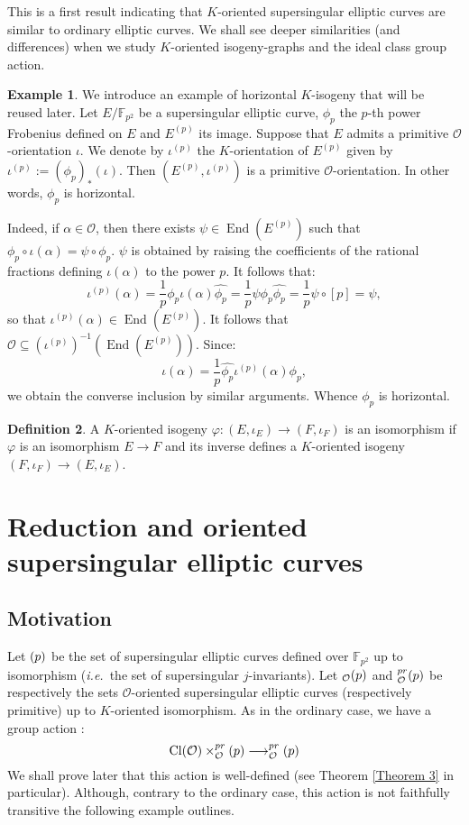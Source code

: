 \documentclass[a4paper,10pt]{report}
\theoremstyle{definition}
\newtheorem{Definition}{Definition}[chapter]
\theoremstyle{plain}
\theoremstyle{definition}
\newtheorem{Example}[Definition]{Example}
\newcommand{\ie}{\emph{i.e.}\ }
\newcommand{\F}{\mathbb{F}}
\newcommand{\mO}{\mathcal{O}}
\renewcommand{\(}{\left(}
\renewcommand{\)}{\right)}
\DeclareMathOperator{\End}{End}
\DeclareMathOperator{\Cl}{Cl}
\let\SS\relax
\DeclareMathOperator{\SS}{SS}
\begin{document}
This is a first result indicating that $K$-oriented supersingular elliptic curves are similar to ordinary elliptic curves. We shall see deeper similarities (and differences) when we study $K$-oriented isogeny-graphs and the ideal class group action.

\begin{Example}
We introduce an example of horizontal $K$-isogeny that will be reused later.  Let $E/\F_{p^2}$ be a supersingular elliptic curve, $\phi_p$ the $p$-th power Frobenius defined on $E$ and $E^{(p)}$ its image. Suppose that $E$ admits a primitive $\mO$-orientation $\iota$.  We denote by $\iota^{(p)}$ the $K$-orientation of $E^{(p)}$ given by $\iota^{(p)}:=(\phi_p)_*(\iota)$.  Then $(E^{(p)},\iota^{(p)})$ is a primitive $\mO$-orientation.  In other words, $\phi_p$ is horizontal.

Indeed, if $\alpha\in\mO$, then there exists $\psi\in\End(E^{(p)})$ such that $\phi_p\circ\iota(\alpha)=\psi\circ\phi_p$. $\psi$ is obtained by raising the coefficients of the rational fractions defining $\iota(\alpha)$ to the power $p$. It follows that:
\[\iota^{(p)}(\alpha)=\frac{1}{p}\phi_p\iota(\alpha)\widehat{\phi_p}=\frac{1}{p}\psi\phi_p\widehat{\phi_p}=\frac{1}{p}\psi\circ[p]=\psi,\]
so that $\iota^{(p)}(\alpha)\in\End(E^{(p)})$. It follows that $\mO\subseteq\(\iota^{(p)}\)^{-1}\(\End\(E^{(p)}\)\)$. Since:
\[\iota(\alpha)=\frac{1}{p}\widehat{\phi_p}\iota^{(p)}(\alpha)\phi_p,\]
we obtain the converse inclusion by similar arguments.  Whence $\phi_p$ is horizontal.
\end{Example}

\begin{Definition}
A $K$-oriented isogeny $\varphi : (E, \iota_E)\longrightarrow(F,\iota_F)$ is an isomorphism if $\varphi$ is an isomorphism $E\longrightarrow F$ and its inverse defines a $K$-oriented isogeny $(F, \iota_F)\longrightarrow(E,\iota_E)$.
\end{Definition}

\section{Reduction and oriented supersingular elliptic curves}

\subsection{Motivation}

Let $\SS(p)$ be the set of supersingular elliptic curves defined over $\F_{p^2}$ up to isomorphism (\ie the set of supersingular $j$-invariants). Let $\SS_{\mO}(p)$ and $\SS_{\mO}^{pr}(p)$ be respectively the sets $\mO$-oriented supersingular elliptic curves (respectively primitive) up to $K$-oriented isomorphism.  As in the ordinary case,  we have a group action :
\[\Cl(\mO)\times \SS_{\mO}^{pr}(p) \longrightarrow \SS_{\mO}^{pr}(p)\]
We shall prove later that this action is well-defined (see Theorem \ref{Theorem 3} in particular).  Although,  contrary to the ordinary case,  this action is not faithfully transitive the following example outlines.
\end{document}
